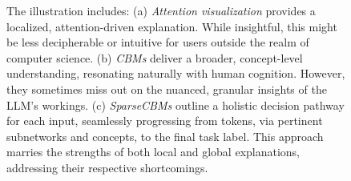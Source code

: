 \documentclass[letterpaper]{article} %
\begin{document}
\begin{figure}[t]
		\centering 
{}
\caption{The illustration includes:
(a) \textit{Attention visualization} provides a localized, attention-driven explanation. While insightful, this might be less decipherable or intuitive for users outside the realm of computer science.
(b) \textit{CBMs} deliver a broader, concept-level understanding, resonating naturally with human cognition. However, they sometimes miss out on the nuanced, granular insights of the LLM's workings.
(c) \textit{SparseCBMs} outline a holistic decision pathway for each input, seamlessly progressing from tokens, via pertinent subnetworks and concepts, to the final task label. This approach marries the strengths of both local and global explanations, addressing their respective shortcomings.}
\label{fig:teaser}
	\end{figure}
\end{document}
